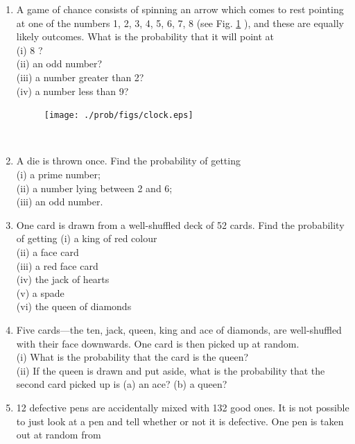 \begin{enumerate}[label=\arabic*.,ref=\thesubsection.\theenumi]
\item A game of chance consists of spinning an arrow which comes to rest pointing at one of the numbers 1, 2, 3, 4, 5, 6, 7, 8 (see Fig. \ref{fig:122} ), and these are equally likely outcomes. What is the probability that it will point at\\
(i) 8 ?\\
(ii) an odd number?\\
(iii) a number greater than 2?\\
(iv) a number less than 9?\\
\begin{figure}[!ht]
\centering
\texttt{[image: ./prob/figs/clock.eps]}
\caption{}
\label{fig:122}
\end{figure}
\\
\solution

\item A die is thrown once. Find the probability of getting\\
(i) a prime number;\\
(ii) a number lying between 2 and 6;\\
(iii) an odd number.
\\
\solution

\item One card is drawn from a well-shuffled deck of 52 cards. Find the probability of getting
(i) a king of red colour\\
(ii) a face card\\
(iii) a red face card\\
(iv) the jack of hearts \\
(v) a spade \\
(vi) the queen of diamonds
\\
\solution

\item Five cards—the ten, jack, queen, king and ace of diamonds, are well-shuffled with their
face downwards. One card is then picked up at random.\\
(i) What is the probability that the card is the queen?\\
(ii) If the queen is drawn and put aside, what is the probability that the second card
picked up is (a) an ace? (b) a queen?
\\
\solution

\item 12 defective pens are accidentally mixed with 132 good ones. It is not possible to just
look at a pen and tell whether or not it is defective. One pen is taken out at random from

\end{enumerate}
